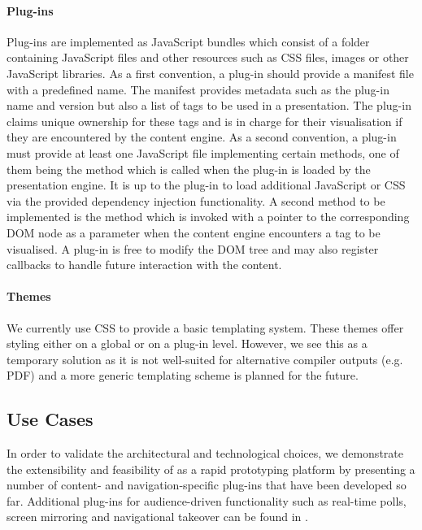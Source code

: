      \paragraph{Plug-ins} Plug-ins are implemented as JavaScript bundles which
      consist of a folder containing JavaScript files and other resources such
      as CSS files, images or other JavaScript libraries. As a first
      convention, a plug-in should provide a manifest file with a predefined
      name. The manifest provides metadata such as the plug-in name and version
      but also a list of tags to be used in a presentation. The plug-in claims
      unique ownership for these tags and is in charge for their visualisation
      if they are encountered by the content engine. As a second convention, a
      plug-in must provide at least one JavaScript file implementing certain
      methods, one of them being the  method which is called when
      the plug-in is loaded by the presentation engine. It is up to the plug-in
      to load additional JavaScript or CSS via the provided dependency
      injection functionality. A second method to be implemented is the
       method which is invoked with a pointer to the
      corresponding DOM node as a parameter when the content engine encounters
      a tag to be visualised. A plug-in is free to modify the DOM tree and may
      also register callbacks to handle future interaction with the content.

     \paragraph{Themes} We currently use CSS to provide a basic templating
      system. These themes offer styling either on a global or on a plug-in
      level. However, we see this as a temporary solution as it is not
      well-suited for alternative compiler outputs (e.g. PDF) and a more
      generic templating scheme is planned for the future.

   \subsection{Use Cases}

    In order to validate the architectural and technological choices, we
    demonstrate the extensibility and feasibility of \mxp as a rapid
    prototyping platform by presenting a number of content- and
    navigation-specific plug-ins that have been developed so far. Additional
    plug-ins for audience-driven functionality such as real-time polls, screen
    mirroring and navigational takeover can be found in \citep{roels-2}.

